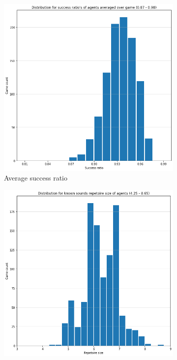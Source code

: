 \begin{figure}[ht]
    \centering
    \begin{subfigure}{.30\textwidth}
        \centering
        \includegraphics[width=\textwidth]{images/results/original_success.png}
        \captionsetup{width=0.9\linewidth}
        \captionsetup{justification=centering}
        \caption{Average success ratio}
    \end{subfigure}
    \hspace{0.5cm}
    \begin{subfigure}{.30\textwidth}
        \centering
        \includegraphics[width=\textwidth]{images/results/original_size.png}

\end{subfigure}
\end{figure}
